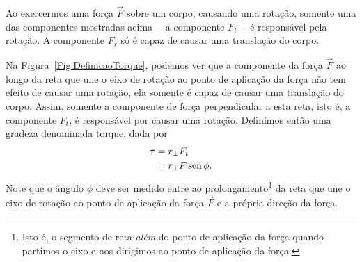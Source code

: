 \begin{marginfigure}
\centering
{}
\caption{Ao exercermos uma força $\vec{F}$ sobre um corpo, causando uma rotação, somente uma das componentes mostradas acima --~a componente $F_t$~-- é responsável pela rotação. A componente $F_r$ só é capaz de causar uma translação do corpo. \label{Fig:DefinicaoTorque}}
\end{marginfigure}

Na Figura~\ref{Fig:DefinicaoTorque}, podemos ver que a componente da força $\vec{F}$ ao longo da reta que une o eixo de rotação ao ponto de aplicação da força não tem efeito de causar uma rotação, ela somente é capaz de causar uma translação do corpo. Assim, somente a componente de força perpendicular a esta reta, isto é, a componente $F_t$, é responsável por causar uma rotação. Definimos então uma gradeza denominada torque, dada por
\begin{align}\label{Eq:DefModTorque}
	\tau &= r_\perp F_t \\
	&= r_\perp F \operatorname{sen}\phi.
\end{align}
%
Note que o ângulo $\phi$ deve ser medido entre ao prolongamento\footnote{Isto é, o segmento de reta \emph{além} do ponto de aplicação da força quando partimos o eixo e nos dirigimos ao ponto de aplicação da força.} da reta que une o eixo de rotação ao ponto de aplicação da força $\vec{F}$ e a própria direção da força.


